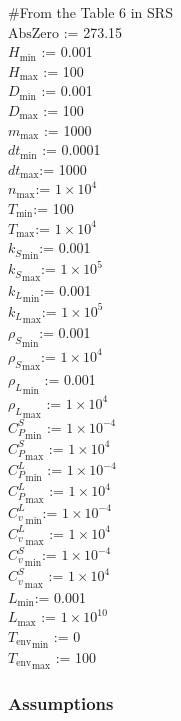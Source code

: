 \documentclass[12pt, titlepage]{article}
\begin{document}
\#From the Table 6 in SRS\\
\noindent
  $\mbox{AbsZero}$ :=  273.15\\
  $H_{\mbox{min}}$ := 0.001\\
  $H_{\mbox{max}}$ := 100 \\
  $D_{\mbox{min}}$ := 0.001 \\
  $D_{\mbox{max}}$ := 100 \\
  $m_{\mbox{max}}$ := 1000\\
  $dt_{\mbox{min}}$ := 0.0001\\
  $dt_{\mbox{max}}$:=  1000 \\
  $n_{\mbox{max}}$:= $1 \times 10^4$\\
  $T_{\mbox{min}}$:=   100 \\
  $T_{\mbox{max}}$:=   $1 \times 10^4$ \\
  ${k_S}_{\mbox{min}}$:=  0.001 \\
  ${k_S}_{\mbox{max}}$:=  $1 \times 10^5$\\
  ${k_L}_{\mbox{min}}$:=  0.001 \\
  ${k_L}_{\mbox{max}}$:=  $1 \times 10^5$\\
  ${\rho_S}_{\mbox{min}}$:=  0.001 \\
  ${\rho_S}_{\mbox{max}}$:=  $1 \times 10^4$\\
  ${\rho_L}_{\mbox{min}}$ := 0.001\\
  ${\rho_L}_{\mbox{max}}$ := $1 \times 10^4$\\
  ${C_P^S}_{\mbox{min}}$ := $1 \times 10^{-4}$\\
  ${C_P^S}_{\mbox{max}}$ := $1 \times 10^{4}$\\
   ${C_P^L}_{\mbox{min}}$ := $1 \times 10^{-4}$\\
  ${C_P^L}_{\mbox{max}}$ := $1 \times 10^{4}$ \\
  ${C_v^L}_{\mbox{min}}$:=  $1 \times 10^{-4}$ \\
  ${C_v^L}_{\mbox{max}}$ := $1 \times 10^{4}$\\
  ${C_v^S}_{\mbox{min}}$:=  $1 \times 10^{-4}$ \\
  ${C_v^S}_{\mbox{max}}$ := $1 \times 10^{4}$ \\
  $L_{\mbox{min}}$:=  0.001 \\
  $L_{\mbox{max}}$ := $1 \times 10^{10}$ \\
  ${T_{\mbox{env}}}_{\mbox{min}}$ := 0 \\
  ${T_{\mbox{env}}}_{\mbox{max}}$ := 100\\
  
\subsubsection{Assumptions}
\end{document}
